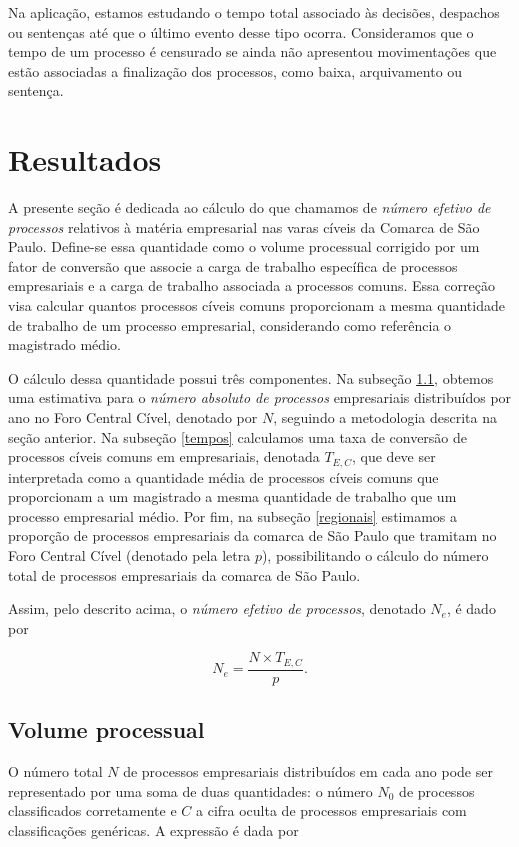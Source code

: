 \documentclass[]{book}
\begin{document}
Na aplicação, estamos estudando o tempo total associado às decisões,
despachos ou sentenças até que o último evento desse tipo ocorra.
Consideramos que o tempo de um processo é censurado se ainda não
apresentou movimentações que estão associadas a finalização dos
processos, como baixa, arquivamento ou sentença.

\chapter{Resultados}\label{resultados}

A presente seção é dedicada ao cálculo do que chamamos de \emph{número
efetivo de processos} relativos à matéria empresarial nas varas cíveis
da Comarca de São Paulo. Define-se essa quantidade como o volume
processual corrigido por um fator de conversão que associe a carga de
trabalho específica de processos empresariais e a carga de trabalho
associada a processos comuns. Essa correção visa calcular quantos
processos cíveis comuns proporcionam a mesma quantidade de trabalho de
um processo empresarial, considerando como referência o magistrado
médio.

O cálculo dessa quantidade possui três componentes. Na subseção
\ref{identificacao}, obtemos uma estimativa para o \emph{número absoluto
de processos} empresariais distribuídos por ano no Foro Central Cível,
denotado por \(N\), seguindo a metodologia descrita na seção anterior.
Na subseção \ref{tempos} calculamos uma taxa de conversão de processos
cíveis comuns em empresariais, denotada \(T_{E,C}\), que deve ser
interpretada como a quantidade média de processos cíveis comuns que
proporcionam a um magistrado a mesma quantidade de trabalho que um
processo empresarial médio. Por fim, na subseção \ref{regionais}
estimamos a proporção de processos empresariais da comarca de São Paulo
que tramitam no Foro Central Cível (denotado pela letra \(p\)),
possibilitando o cálculo do número total de processos empresariais da
comarca de São Paulo.

Assim, pelo descrito acima, o \emph{número efetivo de processos},
denotado \(N_e\), é dado por

\[ 
N_e = \frac{N \times T_{E,C}}{p} .
\]

\section{Volume processual}\label{identificacao}

O número total \(N\) de processos empresariais distribuídos em cada ano
pode ser representado por uma soma de duas quantidades: o número \(N_0\)
de processos classificados corretamente e \(C\) a cifra oculta de
processos empresariais com classificações genéricas. A expressão é dada
por
\end{document}
